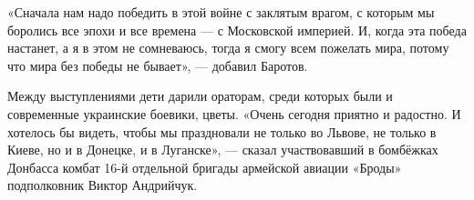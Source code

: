 «Сначала нам надо победить в этой войне с заклятым врагом, с которым мы
боролись все эпохи и все времена --- с Московской империей. И, когда эта победа
настанет, а я в этом не сомневаюсь, тогда я смогу всем пожелать мира, потому
что мира без победы не бывает», --- добавил Баротов.

Между выступлениями дети дарили ораторам, среди которых были и современные
украинские боевики, цветы.  «Очень сегодня приятно и радостно. И хотелось бы
видеть, чтобы мы праздновали не только во Львове, не только в Киеве, но и в
Донецке, и в Луганске», --- сказал участвовавший в бомбёжках Донбасса комбат 16-й
отдельной бригады армейской авиации «Броды» подполковник Виктор Андрийчук.

